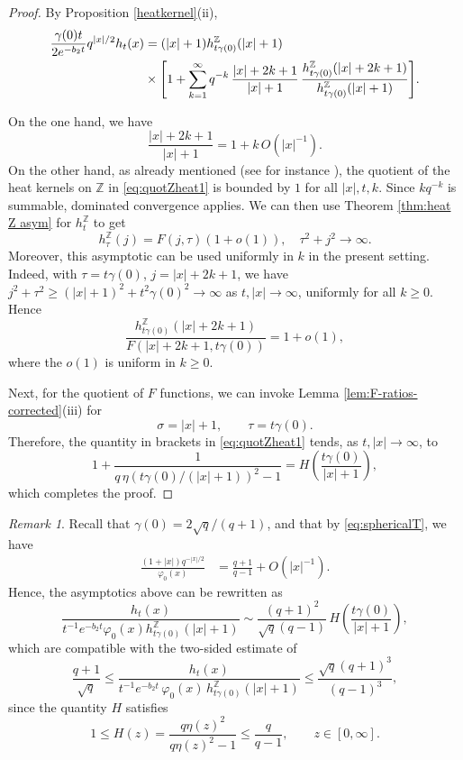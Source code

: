 \documentclass[10pt,a4paper]{amsart}
\theoremstyle{plain}
\theoremstyle{remark}
\newtheorem{remark}[theorem]{Remark}
\theoremstyle{definition}
\begin{document}
	\begin{proof}
		By Proposition \ref{heatkernel}(ii), 
\begin{align}
\frac{\gamma(0)t}{2e^{-b_2t}}q^{|x|/2}h_t(x)&=
(|x|+1)h_{t\gamma(0)}^{\mathbb Z}(|x|+1) \notag \\
&\times\Bigg[
1+
\sum_{k=1}^\infty q^{-k}\,
\frac{|x|+2k+1}{|x|+1}\,
\frac{
h_{t\gamma(0)}^{\mathbb Z}(|x|+2k+1)
}{
h_{t\gamma(0)}^{\mathbb Z}(|x|+1)
}
\Bigg].
\label{eq:quotZheat1}
\end{align}

		On the one hand, we have
\[
\frac{|x|+2k+1}{|x|+1}=1+k\,O(|x|^{-1}).
\] On the other hand, as already mentioned (see for instance \cite[p.4282]{CMS}), the quotient of the heat kernels on $\mathbb{Z}$ in \eqref{eq:quotZheat1} is bounded by $1$ for all $|x|, t, k$. Since $kq^{-k}$ is summable, dominated convergence applies. 
We can then use Theorem \ref{thm:heat Z asym} for $h_t^{\mathbb{Z}}$ to get 
\[
h_\tau^{\mathbb Z}(j)=F(j,\tau)(1+o(1)), \quad \tau^2+j^2\to \infty.
\]
Moreover, this asymptotic can be used uniformly in $k$ in the present setting. Indeed, with $
\tau=t\gamma(0)$, $j=|x|+2k+1$,
we have
$j^2+\tau^2
\ge (|x|+1)^2+t^2\gamma(0)^2
\to \infty$
as $t,|x|\to\infty$, uniformly for all $k\ge0$. Hence
\[
\frac{h_{t\gamma(0)}^{\mathbb Z}(|x|+2k+1)}
{F(|x|+2k+1,t\gamma(0))}
=1+o(1),
\]
where the $o(1)$ is uniform in $k\ge0$. 

Next, for the quotient of $F$ functions,  we can invoke Lemma \ref{lem:F-ratios-corrected}(iii) for
\[
\sigma=|x|+1,
\qquad
\tau=t\gamma(0).
\]
Therefore, the quantity in brackets in \eqref{eq:quotZheat1} tends, as $t, |x|\to \infty$, to 
\[
1+\frac{1}{q\,\eta (t\gamma(0)/(|x|+1))^2-1}=
H\!\left(\frac{t\gamma(0)}{|x|+1}\right),
\]
which completes the proof.
\end{proof}



\begin{remark} Recall that $\gamma(0)=2\sqrt{q}/(q+1)$, and that by \eqref{eq:sphericalT}, we have
	\begin{align}\label{eq:phi0_asympt}
	\frac{(1+|x|)q^{-|x|/2}}{\varphi_0(x)}&=\frac{q+1}{q-1}+O(|x|^{-1}).
	\end{align}
Hence, the asymptotics above can be rewritten as
$$\frac{h_t(x)}
{t^{-1}e^{-b_2t}\varphi_0(x)
h_{t\gamma(0)}^{\mathbb Z}(|x|+1)}
\sim
\frac{(q+1)^2}{\sqrt q (q-1)}\,
H\left(\frac{t\gamma(0)}{|x|+1}\right),$$
which are compatible with the two-sided estimate of 
\cite[Proposition 2.5]{CMS} 	\begin{equation*}
\frac{q+1}{\sqrt{q}}\leq	\frac{h_t(x)}{t^{-1}{e^{-b_2t}}\, \varphi_0(x)\, h_{t\gamma(0)}^{\mathbb{Z}}(|x|+1) }\leq 
	\frac{\sqrt{q}(q+1)^3}{(q-1)^3},
    \end{equation*}
    since the quantity $H$ satisfies
\[
1
\leq
H(z)=\frac{q\eta(z)^2}{q\eta(z)^2-1}
\leq
\frac{q}{q-1},
\qquad z\in[0,\infty].
\]
\end{remark}
	
\end{document}
